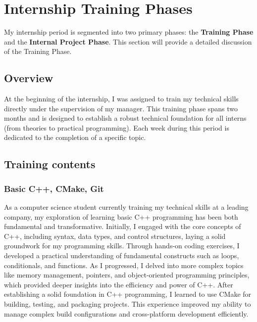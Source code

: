 \section{Internship Training Phases}
My internship period is segmented into two primary phases: the \textbf{Training Phase} and the \textbf{Internal Project Phase}. This section will provide a detailed discussion of the Training Phase.

\subsection{Overview}
    At the beginning of the internship, I was assigned to train my technical skills directly under the supervision of my manager. This training phase spans two months and is designed to establish a robust technical foundation for all interns (from theories to practical programming). Each week during this period is dedicated to the completion of a specific topic.
    

\subsection{Training contents}
    \subsubsection{Basic C++, CMake, Git}
    As a computer science student currently training my technical skills at a leading company, my exploration of learning basic C++ programming has been both fundamental and transformative. Initially, I engaged with the core concepts of C++, including syntax, data types, and control structures, laying a solid groundwork for my programming skills. Through hands-on coding exercises, I developed a practical understanding of fundamental constructs such as loops, conditionals, and functions. As I progressed, I delved into more complex topics like memory management, pointers, and object-oriented programming principles, which provided deeper insights into the efficiency and power of C++. After establishing a solid foundation in C++ programming, I learned to use CMake for building, testing, and packaging projects. This experience improved my ability to manage complex build configurations and cross-platform development efficiently. \\
    
